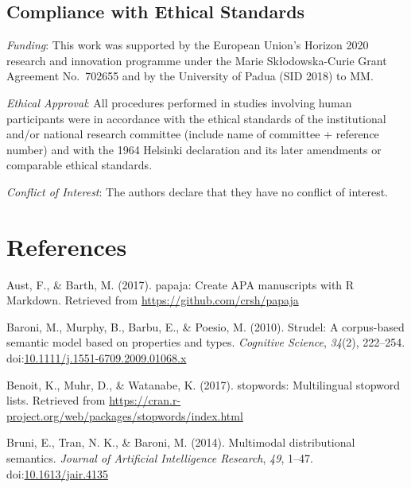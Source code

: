 \documentclass[man]{apa6}
\begin{document}
\hypertarget{compliance-with-ethical-standards}{%
\subsection{Compliance with Ethical Standards}\label{compliance-with-ethical-standards}}

\emph{Funding}: This work was supported by the European Union's Horizon 2020 research and innovation programme under the Marie Skłodowska-Curie Grant Agreement No.~702655 and by the University of Padua (SID 2018) to MM.

\emph{Ethical Approval}: All procedures performed in studies involving human participants were in accordance with the ethical standards of the institutional and/or national research committee (include name of committee + reference number) and with the 1964 Helsinki declaration and its later amendments or comparable ethical standards.

\emph{Conflict of Interest}: The authors declare that they have no conflict of interest.

\newpage

\hypertarget{references}{%
\section{References}\label{references}}

\begingroup
\setlength{\parindent}{-0.5in}
\setlength{\leftskip}{0.5in}

\hypertarget{refs}{}
\leavevmode\hypertarget{ref-Aust2017}{}%
Aust, F., \& Barth, M. (2017). papaja: Create APA manuscripts with R Markdown. Retrieved from \url{https://github.com/crsh/papaja}

\leavevmode\hypertarget{ref-Baroni2010}{}%
Baroni, M., Murphy, B., Barbu, E., \& Poesio, M. (2010). Strudel: A corpus-based semantic model based on properties and types. \emph{Cognitive Science}, \emph{34}(2), 222--254. doi:\href{https://doi.org/10.1111/j.1551-6709.2009.01068.x}{10.1111/j.1551-6709.2009.01068.x}

\leavevmode\hypertarget{ref-Benoit2017}{}%
Benoit, K., Muhr, D., \& Watanabe, K. (2017). stopwords: Multilingual stopword lists. Retrieved from \url{https://cran.r-project.org/web/packages/stopwords/index.html}

\leavevmode\hypertarget{ref-Bruni2014}{}%
Bruni, E., Tran, N. K., \& Baroni, M. (2014). Multimodal distributional semantics. \emph{Journal of Artificial Intelligence Research}, \emph{49}, 1--47. doi:\href{https://doi.org/10.1613/jair.4135}{10.1613/jair.4135}
\end{document}
